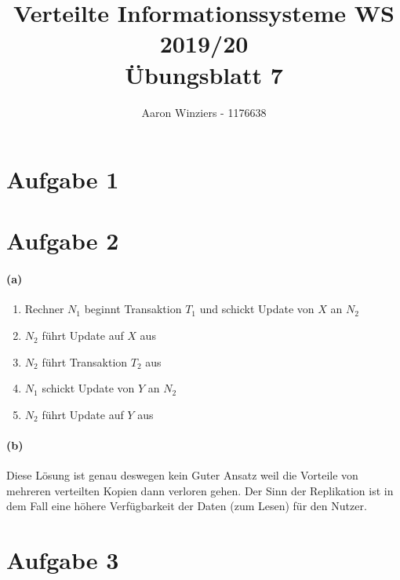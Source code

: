 \documentclass[11pt,a4paper,parskip=half ]{scrartcl}
\author{Aaron Winziers - 1176638}
\title{Verteilte Informationssysteme WS 2019/20\\\LARGE{Übungsblatt 7}}
\begin{document}
	\maketitle
\section*{Aufgabe 1}


\section*{Aufgabe 2}
\paragraph{(a)} 
\begin{enumerate}
	\item Rechner $N_{1}$ beginnt Transaktion $T_{1}$ und schickt Update von $X$ an $N_{2}$
	\item $N_{2}$ führt Update auf $X$ aus
	\item $N_{2}$ führt Transaktion $T_{2}$ aus
	\item $N_{1}$ schickt Update von $Y$ an $N_{2}$
	\item $N_{2}$ führt Update auf $Y$ aus
\end{enumerate}

\paragraph{(b)} Diese Lösung ist genau deswegen kein Guter Ansatz weil die Vorteile von mehreren verteilten Kopien dann verloren gehen. Der Sinn der Replikation ist in dem Fall eine höhere Verfügbarkeit der Daten (zum Lesen) für den Nutzer.


\section*{Aufgabe 3}
\end{document}
